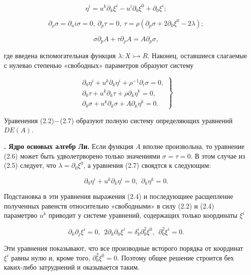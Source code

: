 \documentclass{report}
\newcounter{nrazd}
\newcommand{\razd}[1]{\addtocounter{nrazd}{1}
\setcounter{equation}{0}
\textbf{\thenrazd. #1}}
\begin{document}
\begin{equation} \label{eq2.4}
        \eta^i = u^k \partial_k \xi^i - u^i \partial_0 \xi^0 + \partial_0 \xi^i;
\end{equation}

\begin{equation} \label{eq2.5}
        \partial_\rho \sigma = \partial_u i \sigma = 0, \ \partial_p \tau = 0, \ \tau = \rho(\partial_p \sigma + 2\partial_0 \xi^0 - 2\lambda);
\end{equation}

\begin{equation} \label{eq2.6}
        \sigma\partial_p A + \tau\partial_\rho A = A \partial_p \sigma,
\end{equation}

где введена вспомогательная функция $\lambda : X \rightarrowtail R$. Наконец, оставшиеся слагаемые с нулевао степенью «свободных» параметров образуют систему

\begin{equation} \label{eq2.1} \left.
\begin{array}{r}
        \partial_0 \eta^i + u^k \partial_k \eta^i + \rho^{-1} \partial_i \sigma = 0, \\
        \partial_0 \tau + u^k \partial_k \tau + \rho \partial_k \eta^k = 0, \\
        \partial_0 \sigma + u^k \partial_k \sigma + A\partial_k \eta^k = 0.
\end{array}
\right\} \end{equation}


Уравенения (2.2)$\--$(2.7)  образуют полную систему определяющих уравнений $DE(A)$.


\razd{Ядро основых алгебр Ли.}
Если функция $A$ вполне произвольна, то уравнение (2.6) может быть удволетрворено только значениями $\sigma = \tau = 0$. В этом случае из (2.5) следует, что $\lambda = \partial_0 \xi^0$, а уравнения (2.7) своядтся к следующим:

\begin{equation} \label{eq3.1}
        \partial_0 \eta^i + u^k \partial_k \eta^i = 0, \ \ \partial_k \eta^k = 0.
\end{equation}

Подстановка в эти уравнения выражения (2.4) и последующиее расщепление полученных равенств относительно «свободными» в силу (2.2) и (2.4) параметрво $u^k$ приводит у системе уравнений, содержащих только координаты $\xi^i$

\begin{equation} \label{eq3.2}
        \partial_k \partial_j \xi^i = 0, \ \ 2\partial_k \partial_0 \xi^i = \delta^i_k \partial^2_0 \xi^0, \ \ \partial^2_0 \xi^i = 0.
\end{equation}

Эти уравнения показывают, что все производные всторого порядка от координат $\xi^i$ равны нулю и, кроме того, $\partial^2_0 \xi^0 = 0$. Поэтому общее решение строится бех каких-либо затруднений и оказывается таким.
\end{document}
